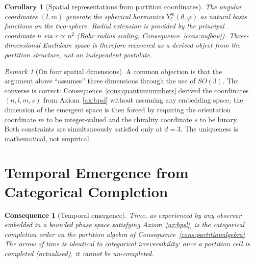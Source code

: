 \documentclass[11pt,twocolumn,a4paper]{article}
\theoremstyle{axiomstyle}
\theoremstyle{conseqstyle}
\newtheorem{consequence}{Consequence}
\newtheorem{corollary}{Corollary}
\theoremstyle{definition}
\theoremstyle{remark}
\newtheorem*{remark}{Remark}
\begin{document}
\begin{corollary}[Spatial representations from partition coordinates]\label{cor:spatialreps}
The angular coordinates $(l,m)$ generate the spherical harmonics $Y_{l}^{m}(\theta,\varphi)$ as natural basis functions on the two-sphere. Radial extension is provided by the principal coordinate $n$ via $r\propto n^{2}$ (Bohr radius scaling, Consequence~\ref{cons:aufbau}). Three-dimensional Euclidean space is therefore recovered as a derived object from the partition structure, not an independent postulate.
\end{corollary}

\begin{remark}[On four spatial dimensions]
A common objection is that the argument above ``assumes'' three dimensions through the use of $SO(3)$. The converse is correct: Consequence~\ref{cons:quantumnumbers} derived the coordinates $(n,l,m,s)$ from Axiom~\ref{ax:bpsl} without assuming any embedding space; the dimension of the emergent space is then forced by requiring the orientation coordinate $m$ to be integer-valued and the chirality coordinate $s$ to be binary. Both constraints are simultaneously satisfied only at $d=3$. The uniqueness is mathematical, not empirical.
\end{remark}

\section{Temporal Emergence from Categorical Completion}
\label{sec:temporalemergence}

\begin{consequence}[Temporal emergence]\label{cons:temporalemergence}
Time, as experienced by any observer embedded in a bounded phase space satisfying Axiom~\ref{ax:bpsl}, is the categorical completion order on the partition algebra of Consequence~\ref{cons:partitionalgebra}. The arrow of time is identical to categorical irreversibility: once a partition cell is completed (actualised), it cannot be un-completed.
\end{consequence}
\end{document}
